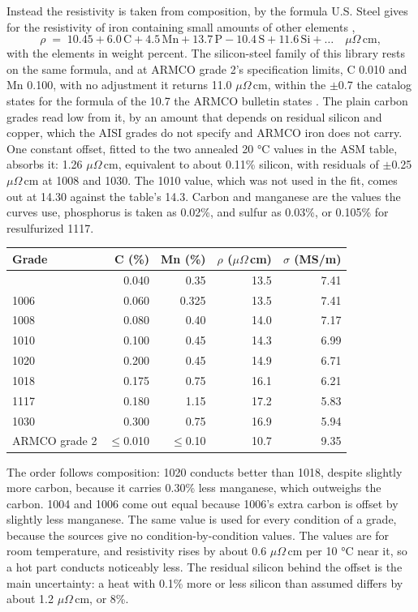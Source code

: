\documentclass[
  11pt,
]{article}
\newcounter{none} %
\begin{document}
Instead the resistivity is taken from composition, by the formula U.S. Steel gives for the resistivity of iron containing small amounts of other elements \cite{uss1978},
\begin{equation}\label{eq:rho}
\rho \;=\; 10.45 + 6.0\,\mathrm{C} + 4.5\,\mathrm{Mn} + 13.7\,\mathrm{P} - 10.4\,\mathrm{S} + 11.6\,\mathrm{Si} + \ldots \quad \mu\Omega\,\mathrm{cm},
\end{equation}
with the elements in weight percent. The silicon-steel family of this library rests on the same formula, and at ARMCO grade 2's specification limits, C 0.010 and Mn 0.100, with no adjustment it returns 11.0 \(\mu\Omega\)\,cm, within the \(\pm\)0.7 the catalog states for the formula of the 10.7 the ARMCO bulletin states \cite{armco-iron}. The plain carbon grades read low from it, by an amount that depends on residual silicon and copper, which the AISI grades do not specify and ARMCO iron does not carry. One constant offset, fitted to the two annealed 20 °C values in the ASM table, absorbs it: 1.26 \(\mu\Omega\)\,cm, equivalent to about 0.11\% silicon, with residuals of \(\pm\)0.25 \(\mu\Omega\)\,cm at 1008 and 1030. The 1010 value, which was not used in the fit, comes out at 14.30 against the table's 14.3. Carbon and manganese are the values the curves use, phosphorus is taken as 0.02\%, and sulfur as 0.03\%, or 0.105\% for resulfurized 1117.

{\def\LTcaptype{none} %
\begin{longtable}[]{@{}lrrrr@{}}
\toprule\noalign{}
Grade & C (\%) & Mn (\%) & \(\rho\) (\(\mu\Omega\)\,cm) & \(\sigma\) (MS/m) \\
\midrule\noalign{}
\endhead
\bottomrule\noalign{}
\endlastfoot
1004 & 0.040 & 0.35 & 13.5 & 7.41 \\
1006 & 0.060 & 0.325 & 13.5 & 7.41 \\
1008 & 0.080 & 0.40 & 14.0 & 7.17 \\
1010 & 0.100 & 0.45 & 14.3 & 6.99 \\
1020 & 0.200 & 0.45 & 14.9 & 6.71 \\
1018 & 0.175 & 0.75 & 16.1 & 6.21 \\
1117 & 0.180 & 1.15 & 17.2 & 5.83 \\
1030 & 0.300 & 0.75 & 16.9 & 5.94 \\
ARMCO grade 2 & \(\le\)0.010 & \(\le\)0.10 & 10.7 & 9.35 \\
\end{longtable}
}

The order follows composition: 1020 conducts better than 1018, despite slightly more carbon, because it carries 0.30\% less manganese, which outweighs the carbon. 1004 and 1006 come out equal because 1006's extra carbon is offset by slightly less manganese. The same value is used for every condition of a grade, because the sources give no condition-by-condition values. The values are for room temperature, and resistivity rises by about 0.6 \(\mu\Omega\)\,cm per 10 °C near it, so a hot part conducts noticeably less. The residual silicon behind the offset is the main uncertainty: a heat with 0.1\% more or less silicon than assumed differs by about 1.2 \(\mu\Omega\)\,cm, or 8\%.
\end{document}
